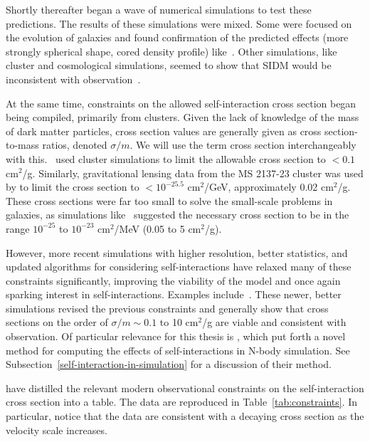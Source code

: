 Shortly thereafter began a wave of numerical simulations to test these
predictions. The results of these simulations were mixed. Some were focused on
the evolution of galaxies and found confirmation of the predicted effects
(more strongly spherical shape, cored density profile)
like~\cite{burkert_structure_2000,dave_halo_2001}. Other simulations, like
cluster and cosmological simulations, seemed to show that SIDM would be
inconsistent with
observation~\cite{moore_collisional_2000,yoshida_collisional_2000,yoshida_weakly_2000}.

At the same time, constraints on the allowed self-interaction cross section
began being compiled, primarily from clusters. Given the lack of knowledge of
the mass of dark matter particles, cross section values are generally given as
cross section-to-mass ratios, denoted $\sigma/m$. We will use the term cross
section interchangeably with this. \cite{meneghetti_giant_2001}~used cluster
simulations to limit the allowable cross section to \(< 0.1\) cm\(^2\)/g.
Similarly, gravitational lensing data from the MS 2137-23 cluster was used by
\cite{miralda-escude_test_2002} to limit the cross section to \(< 10^{-25.5}\)
cm\(^2\)/GeV, approximately 0.02 cm\(^2\)/g. These cross sections were far too
small to solve the small-scale problems in galaxies, as simulations
like~\cite{dave_halo_2001} suggested the necessary cross section to be in the
range \(10^{-25}\) to \(10^{-23}\) cm\(^2\)/MeV (0.05 to 5 cm\(^2\)/g).

However, more recent simulations with higher resolution, better statistics,
and updated algorithms for considering self-interactions have relaxed many of
these constraints significantly, improving the viability of the model and once
again sparking interest in self-interactions. Examples
include~\cite{rocha_cosmological_2013,peter_cosmological_2013,zavala_constraining_2013,elbert_core_2015}.
These newer, better simulations revised the previous constraints and generally
show that cross sections on the order of $\sigma / m \sim 0.1$ to 10
cm$^2$/g are viable and consistent with observation. Of particular relevance
for this thesis is \cite{rocha_cosmological_2013}, which put forth a novel
method for computing the effects of self-interactions in N-body simulation.
See Subsection~\ref{self-interaction-in-simulation} for a discussion of their
method.

\cite{tulin_dark_2018} have distilled the relevant modern observational
constraints on the self-interaction cross section into a table. The data are
reproduced in Table~\ref{tab:constraints}. In particular, notice that the data
are consistent with a decaying cross section as the velocity scale increases.

